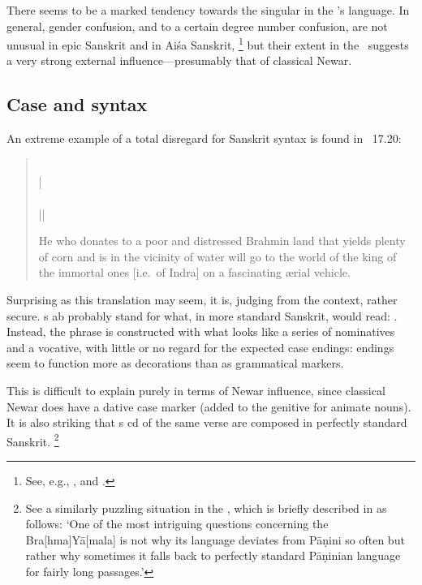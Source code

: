 There seems to be a marked tendency towards the singular in the \VSS's language. 
In general, gender confusion, and to a certain degree number confusion, are
not unusual in epic Sanskrit and in Aiśa Sanskrit,%
		\footnote{See, e.g., , and
                .}
but their extent in the \VSS\ suggests a very strong external influence---presumably
that of classical Newar.									





\subsection{Case and syntax}

An extreme example of a total disregard for Sanskrit syntax is found in \VSS~17.20:

\begin{quote}
\label{extremelanguage}
\\
 |\\
\\
 ||

He who donates to a poor and distressed Brahmin land that yields plenty of corn and is in the vicinity of water will go to the world of the king of the immortal ones [i.e.\ of Indra] on a fascinating \ae rial vehicle.
\end{quote}            
            
\noindent            
Surprising as this translation may seem, it is, judging from the context, rather secure. 
s ab probably stand for what, in more standard Sanskrit, would read:
.
Instead, the phrase is constructed with what looks like a series of nominatives and a
vocative, with little or no regard for the expected case endings: endings seem to function more
as decorations than as grammatical markers.

This is difficult to explain purely in terms of Newar influence, since classical Newar does have
a dative case marker (added to the genitive for animate nouns). 
It is also striking that s cd of the same verse are composed in perfectly standard Sanskrit.%
		\footnote{See a similarly puzzling situation in the \BraYa, 
                 which is briefly described in  as follows:
		`One of the most intriguing questions concerning the Bra[hma]Yā[mala] 
		is not why its language deviates from Pāṇini so often 
		but rather why sometimes it falls back to perfectly standard 
		Pāṇinian language for fairly long passages.'}

